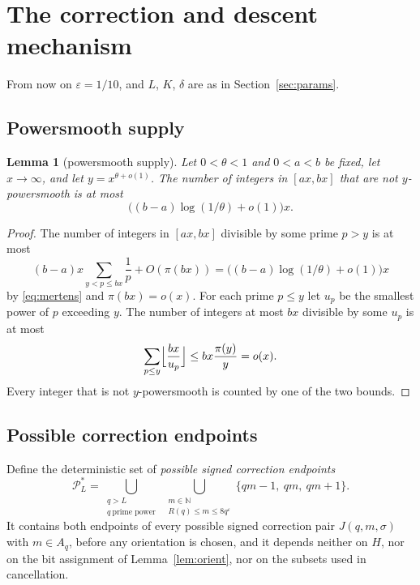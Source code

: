 \documentclass[11pt,letterpaper]{article}
\numberwithin{equation}{section}
\theoremstyle{plain}
\newtheorem{lemma}{Lemma}
\theoremstyle{remark}
\newcommand{\N}{\mathbb N}
\newcommand{\cP}{\mathcal P}
\begin{document}
\section{The correction and descent mechanism}\label{sec:descent}

From now on $\varepsilon=1/10$, and $L$, $K$, $\delta$ are as in Section~\ref{sec:params}.

\subsection{Powersmooth supply}\label{sec:supply}

\begin{lemma}[powersmooth supply]\label{lem:supply}
Let $0<\theta<1$ and $0<a<b$ be fixed, let $x\to\infty$, and let $y=x^{\theta+o(1)}$. The number of integers in $[ax,bx]$ that are not $y$-powersmooth is at most
\begin{equation}\label{eq:supply}
\bigl((b-a)\log(1/\theta)+o(1)\bigr)x .
\end{equation}
\end{lemma}

\begin{proof}
The number of integers in $[ax,bx]$ divisible by some prime $p>y$ is at most
\[
(b-a)x\sum_{y<p\le bx}\frac1p+O(\pi(bx))=\bigl((b-a)\log(1/\theta)+o(1)\bigr)x
\]
by \eqref{eq:mertens} and $\pi(bx)=o(x)$. For each prime $p\le y$ let $u_p$ be the smallest power of $p$ exceeding $y$. The number of integers at most $bx$ divisible by some $u_p$ is at most
\[
\sum_{p\le y}\Bigl\lfloor\frac{bx}{u_p}\Bigr\rfloor\le bx\frac{\pi(y)}y=o(x).
\]
Every integer that is not $y$-powersmooth is counted by one of the two bounds.
\end{proof}

\subsection{Possible correction endpoints}\label{sec:Pstar}

Define the deterministic set of \emph{possible signed correction endpoints}
\begin{equation}\label{eq:D1}
\cP^*_L=\bigcup_{\substack{q>L\\ q\ \text{prime power}}}\ \bigcup_{\substack{m\in\N\\ R(q)\le m\le8q^\varepsilon}}\{qm-1,\ qm,\ qm+1\}.
\end{equation}
It contains both endpoints of every possible signed correction pair $J(q,m,\sigma)$ with $m\in A_q$, before any orientation is chosen, and it depends neither on $H$, nor on the bit assignment of Lemma~\ref{lem:orient}, nor on the subsets used in cancellation.
\end{document}
